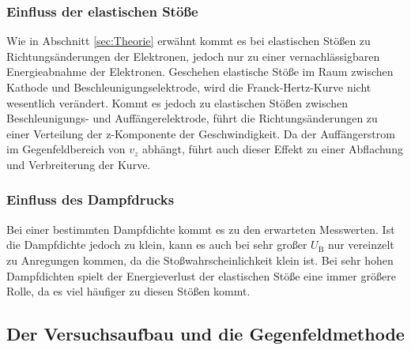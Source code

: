 \subsubsection{Einfluss der elastischen Stöße}

Wie in Abschnitt \ref{sec:Theorie} erwähnt kommt es bei elastischen Stößen zu Richtungsänderungen der Elektronen, jedoch nur zu einer vernachlässigbaren Energieabnahme der Elektronen.
Geschehen elastische Stöße im Raum zwischen Kathode und Beschleunigungselektrode, wird die Franck-Hertz-Kurve nicht wesentlich verändert.
Kommt es jedoch zu elastischen Stößen zwischen Beschleunigungs- und Auffängerelektrode, führt die Richtungsänderungen zu einer Verteilung der z-Komponente der Geschwindigkeit.
Da der Auffängerstrom im Gegenfeldbereich von $v_z$ abhängt, führt auch dieser Effekt zu einer Abflachung und Verbreiterung der Kurve.

\subsubsection{Einfluss des Dampfdrucks}

Bei einer bestimmten Dampfdichte kommt es zu den erwarteten Messwerten. Ist die Dampfdichte jedoch zu klein, kann es auch bei sehr großer $U_\text{B}$ nur vereinzelt
zu Anregungen kommen, da die Stoßwahrscheinlichkeit klein ist. Bei sehr hohen Dampfdichten spielt der Energieverlust der elastischen Stöße eine immer größere Rolle, da es viel häufiger zu
diesen Stößen kommt.

\subsection{Der Versuchsaufbau und die Gegenfeldmethode}

